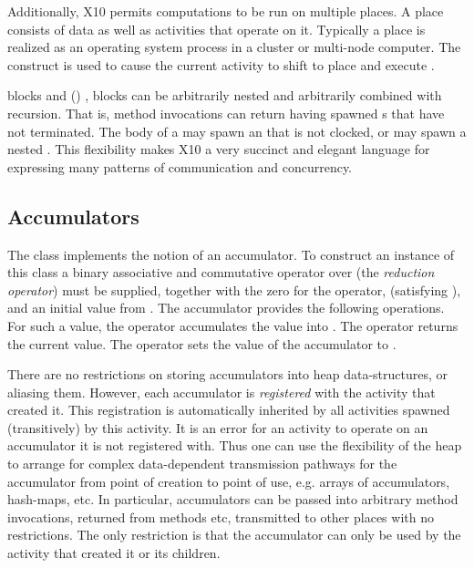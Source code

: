 Additionally, X10 permits computations to be run on multiple places. A
place consists of data as well as activities that operate on
it. Typically a place is realized as  an operating system process in a
cluster or multi-node computer. The  construct is used
to cause the current activity to shift to place  and execute
. 

 blocks and () , 
blocks can be arbitrarily nested and arbitrarily combined with
recursion. That is, method invocations can return having spawned
s that have not terminated. The body  of a
 may spawn an  that is not
clocked, or may spawn a nested .
This flexibility makes X10 a very succinct and elegant
language for expressing many patterns of communication and
concurrency.

\subsection{Accumulators}

The class  implements the notion of an accumulator. To
construct an instance of this class a binary associative and
commutative operator   over  (the {\em reduction operator}) must be supplied,
together with the zero for the operator,  (satisfying
  ), and an initial value from . The accumulator
  provides the following operations. For  such a value, the
  operator  accumulates the value  into
  . The operator  returns the current value. The
  operator  sets the value of the accumulator to
  . 

There are no restrictions on storing accumulators into heap
data-structures, or aliasing them.  However, each accumulator is {\em
  registered} with the activity that created it. This registration is
automatically inherited by all activities spawned (transitively) by
this activity. It is an error for an activity to operate on an
accumulator it is not registered with.  Thus one can use the
flexibility of the heap to arrange for complex data-dependent
transmission pathways for the accumulator from point of creation to
point of use, e.g.{} arrays of accumulators, hash-maps, etc. In
particular, accumulators can be passed into arbitrary method
invocations, returned from methods etc, transmitted to other places
with no restrictions. The only restriction is that the accumulator can
only be used by the activity that created it or its children.

